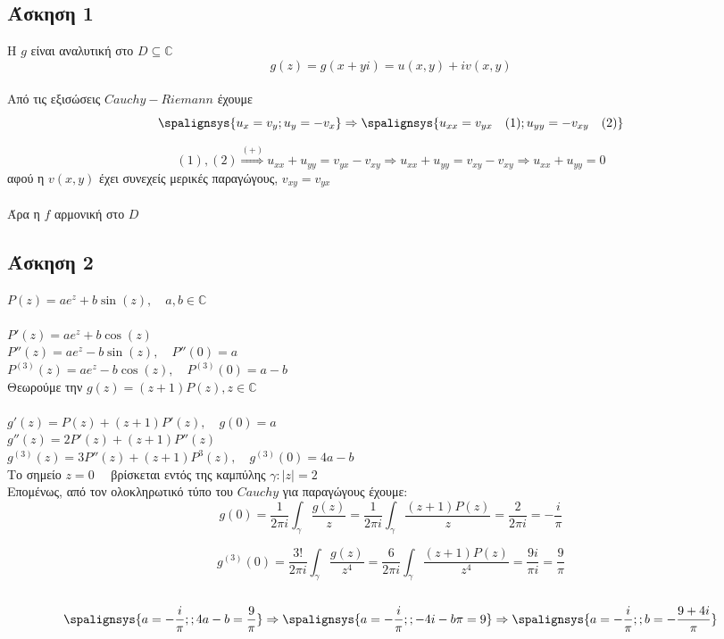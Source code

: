 \documentclass[12pt]{article}
\begin{document}
 \subsection{Άσκηση 1}

Η $g$ είναι αναλυτική στο $D\subseteq \mathbb{C}$
\\
$$ g(z)=g(x+yi)=u(x,y)+iv(x,y) $$
\\
Από τις εξισώσεις $Cauchy-Riemann$ έχουμε
\\
\[
\spalignsys {u_x=v_y;u_y=-v_x} \Rightarrow    
\spalignsys {u_{xx}=v_{yx} \quad (1);u_{yy}=-v_{xy} \quad (2) }
\]

$$(1),(2)\overset{(+)}{\Rightarrow} u_{xx}+u_{yy}=v_{yx}-v_{xy} \Rightarrow u_{xx}+u_{yy}=v_{xy}-v_{xy} \Rightarrow u_{xx}+u_{yy}=0 $$
αφού η $ v(x,y) $ έχει συνεχείς μερικές παραγώγους, $v_{xy}=v_{yx} $
\\ \\
Άρα η $f$ αρμονική στο $D$


 \subsection{Άσκηση 2}

$ P(z)=ae^{z}+b\sin(z), \quad a,b\in\mathbb{C} $\\ \\
$ P'(z)=ae^{z}+b\cos(z) $\\
$ P''(z)=ae^{z}-b\sin(z) ,\quad P''(0)=a$\\
$ P^{(3)}(z)=ae^{z}-b\cos(z),\quad P^{(3)}(0)=a-b $\\

Θεωρούμε την $g(z)=(z+1)P(z),z\in \mathbb{C}$
\\ \\
$ g'(z)=P(z)+(z+1)P'(z) ,\quad g(0)=a $\\
$ g''(z)=2P'(z)+(z+1)P''(z) $\\
$ g^{(3)}(z)=3P''(z)+(z+1)P^{3}(z), \quad g^{(3)}(0)=4a-b $\\


Το σημείο $ z=0 \quad$ βρίσκεται εντός της καμπύλης $\gamma : |z|=2$
\\
Επομένως, από τον ολοκληρωτικό τύπο του $Cauchy$ για παραγώγους έχουμε:
$$ g(0)=\frac{1}{2\pi i} \int_\gamma \frac{g(z)}{z}=\frac{1}{2\pi i} \int_\gamma \frac{(z+1)P(z)}{z}=\frac{2}{2\pi i}=-\frac{i}{\pi} $$

$$ g^{(3)}(0)=\frac{3!}{2\pi i} \int_\gamma \frac{g(z)}{z^4}=\frac{6}{2\pi i} \int_\gamma \frac{(z+1)P(z)}{z^4}=\frac{9i}{\pi i}=\frac{9}{\pi} $$
\\
\[
\spalignsys {a=-\frac{i}{\pi}; ;4a-b=\frac{9}{\pi}}
\Rightarrow
\spalignsys { a=-\frac{i}{\pi}; ;-4i-b\pi= 9}
\Rightarrow
\spalignsys {a=-\frac{i}{\pi}; ;b=-\frac{9+4i}{\pi} }
\]
\end{document}
